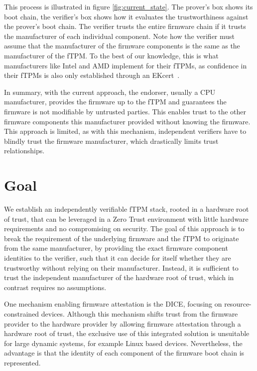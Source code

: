 

This process is illustrated in figure \autoref{fig:current_state}.
The prover's box shows its boot chain, the verifier's box shows how it evaluates the trustworthiness against the prover's boot chain.
The verifier trusts the entire firmware chain if it trusts the manufacturer of each individual component.
Note how the verifier must assume that the manufacturer of the firmware components is the same as the manufacturer of the fTPM\@.
To the best of our knowledge, this is what manufacturers like Intel and AMD implement for their \acp{fTPM}, as confidence in their \acp{fTPM} is also only established through an EKcert~\cite{Ruan2014}.


In summary, with the current approach, the endorser, usually a CPU manufacturer, provides the firmware up to the fTPM and guarantees the firmware is not modifiable by untrusted parties.
This enables trust to the other firmware components this manufacturer provided without knowing the firmware.
This approach is limited, as with this mechanism, independent verifiers have to blindly trust the firmware manufacturer, which drastically limits trust relationships.

\section{Goal}

We establish an independently verifiable fTPM stack, rooted in a hardware root of trust, that can be leveraged in a Zero Trust environment with little hardware requirements and no compromising on security.
The goal of this approach is to break the requirement of the underlying firmware and the fTPM to originate from the same manufacturer, by providing the exact firmware component identities to the verifier, such that it can decide for itself whether they are trustworthy without relying on their manufacturer.
Instead, it is sufficient to trust the independent manufacturer of the hardware root of trust, which in contrast requires no assumptions.


One mechanism enabling firmware attestation is the \ac{DICE}, focusing on resource-constrained devices.
Although this mechanism shifts trust from the firmware provider to the hardware provider by allowing firmware attestation through a hardware root of trust, the exclusive use of this integrated solution is unsuitable for large dynamic systems, for example Linux based devices.
Nevertheless, the advantage is that the identity of each component of the firmware boot chain is represented.

